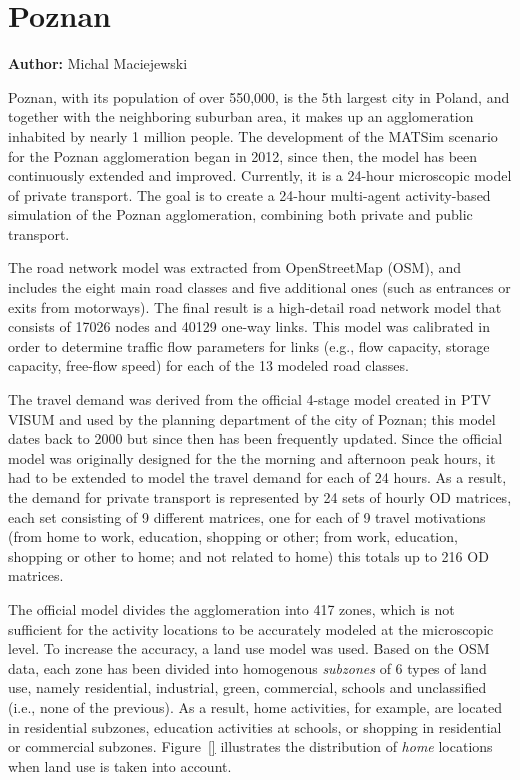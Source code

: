 \section{Poznan}
\label{sec:poznan}
\hfill \textbf{Author:} Michal Maciejewski

Poznan, with its population of over 550,000, is the 5th largest city in Poland, and together with the neighboring suburban area, it makes up an agglomeration inhabited by nearly 1 million people. The development of the MATSim scenario for the Poznan agglomeration began in 2012, since then, the model has been continuously extended and improved. Currently, it is a 24-hour microscopic model of private transport. The goal is to create a 24-hour multi-agent activity-based simulation of the Poznan agglomeration, combining both private and public transport.

The road network model was extracted from OpenStreetMap (OSM), and includes the eight main road classes and five additional ones (such as entrances or exits from motorways). The final result is a high-detail road network model that consists of 17026 nodes and 40129 one-way links. This model was calibrated in order to determine traffic flow parameters for links (e.g., flow capacity, storage capacity, free-flow speed) for each of the 13 modeled road classes. 

The travel demand was derived from the official 4-stage model created in PTV VISUM and used by the planning department of the city of Poznan; this model dates back to 2000 but since then has been frequently updated. Since the official model was originally designed for the the morning and afternoon peak hours, it had to be extended to model the travel demand for each of 24 hours. As a result, the demand for private transport is represented by 24 sets of hourly OD matrices, each set consisting of 9 different matrices, one for each of 9 travel motivations (from home to work, education, shopping or other; from work, education, shopping or other to home; and not related to home) this totals up to 216 OD matrices. 

The official model divides the agglomeration into 417 zones, which is not sufficient for the activity locations to be accurately modeled at the microscopic level. To increase the accuracy, a land use model was used. Based on the OSM data, each zone has been divided into homogenous \emph{subzones} of 6 types of land use, namely residential, industrial, green, commercial, schools and unclassified (i.e., none of the previous). As a result, home activities, for example, are located in residential subzones, education activities at schools, or shopping in residential or commercial subzones. Figure~\ref{} illustrates the distribution of \emph{home} locations when land use is taken into account. 


